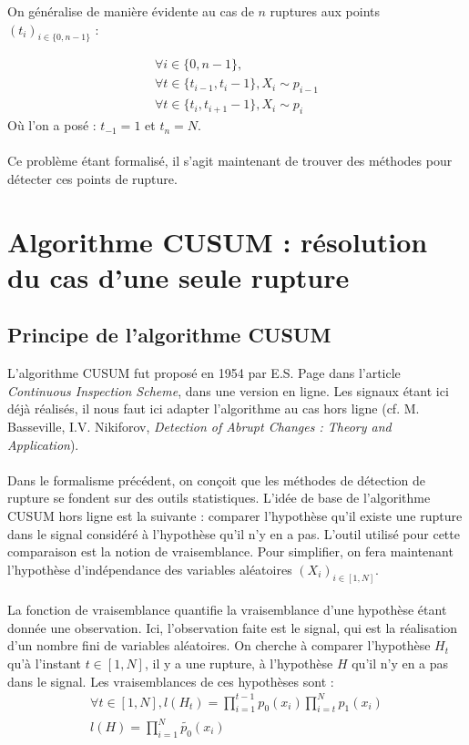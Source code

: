\documentclass[french,12pt,notitlepage]{report}
\begin{document}
	On généralise de manière évidente au cas de $n$ ruptures aux points $(t_i)_{i \in \{0, n-1\}}$ :
	
	\begin{equation}
	\begin{array}{lll}
		\forall i \in \{0, n-1\}, \\
		\forall t \in \{t_{i-1}, t_i-1\}, X_i \sim p_{i-1} \\
		\forall t \in \{t_i, t_{i+1}-1\}, X_i \sim p_i
	\end{array}
	\end{equation}
	Où l'on a posé : $t_{-1} = 1$ et $t_n = N$.
	\\ \\
	Ce problème étant formalisé, il s'agit maintenant de trouver des méthodes pour détecter ces points de rupture.
	
	\chapter{Algorithme CUSUM : résolution du cas d'une seule rupture}
	
	
	\section{Principe de l'algorithme CUSUM}
	L'algorithme CUSUM fut proposé en 1954 par E.S. Page dans l'article \textit{Continuous Inspection Scheme}, dans une version en ligne. Les signaux étant ici déjà réalisés, il nous faut ici adapter l'algorithme au cas hors ligne (cf. M. Basseville, I.V. Nikiforov, \textit{Detection of Abrupt Changes : Theory and Application}).
	\\ \\
	Dans le formalisme précédent, on conçoit que les méthodes de détection de rupture se fondent sur des outils statistiques. L'idée de base de l'algorithme CUSUM hors ligne est la suivante : comparer l'hypothèse qu'il existe une rupture dans le signal considéré à l'hypothèse qu'il n'y en a pas. L'outil utilisé pour cette comparaison est la notion de vraisemblance. Pour simplifier, on fera maintenant l'hypothèse d'indépendance des variables aléatoires $(X_i)_{i \in [1,N]}$.
	\\ \\
	La fonction de vraisemblance quantifie la vraisemblance d'une hypothèse étant donnée une observation. Ici, l'observation faite est le signal, qui est la réalisation d'un nombre fini de variables aléatoires. On cherche à comparer l'hypothèse $H_t$ qu'à l'instant $t \in [1, N]$, il y a une rupture, à l'hypothèse $H$ qu'il n'y en a pas dans le signal. Les vraisemblances de ces hypothèses sont :
	\begin{equation}
	\begin{array}{ll}
		\forall t \in [1, N],l(H_t) = \prod_{i = 1}^{t-1} p_0(x_i) \prod_{i = t}^{N} p_1(x_i) \\
		l(H) = \prod_{i = 1}^N \tilde{p_0}(x_i) \\
	\end{array}	
	\end{equation}
	
\end{document}
